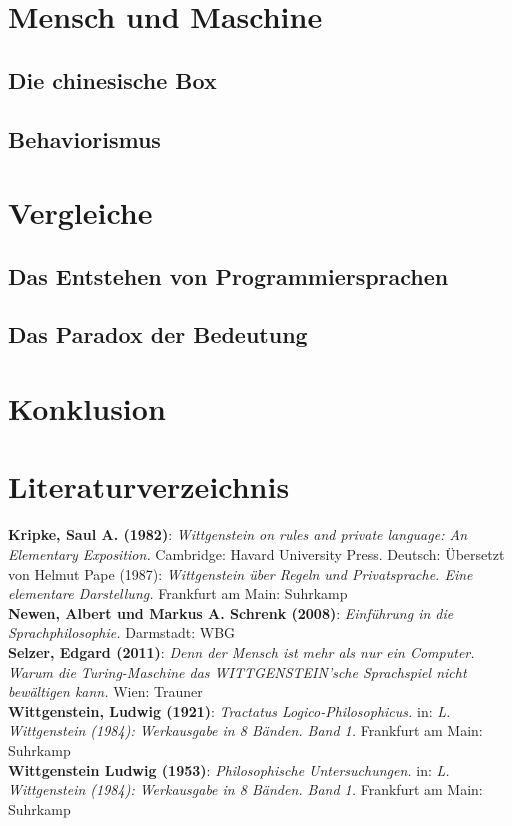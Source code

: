 \documentclass[a4paper,12pt]{article}
\begin{document}
\section{Mensch und Maschine}
\blindtext[1]

\subsection{Die chinesische Box}
\blindtext[1]

\subsection{Behaviorismus}
\blindtext[1]


\section{Vergleiche}
\blindtext[1]

\subsection{Das Entstehen von Programmiersprachen}
\blindtext[1]

\subsection{Das Paradox der Bedeutung}
\blindtext[1]

\section{Konklusion}
\blindtext[1]

\section*{Literaturverzeichnis}
\textbf{Kripke, Saul A. (1982)}: \textit{Wittgenstein on rules and private language: An Elementary Exposition.} Cambridge: Havard University Press. Deutsch: Übersetzt von Helmut Pape (1987): \textit{Wittgenstein über Regeln und Privatsprache. Eine elementare Darstellung.} Frankfurt am Main: Suhrkamp \\
\textbf{Newen, Albert und Markus A. Schrenk (2008)}: \textit{Einführung in die Sprachphilosophie.} Darmstadt: WBG \\
\textbf{Selzer, Edgard (2011)}: \textit{Denn der Mensch ist mehr als nur ein Computer. Warum die Turing-Maschine das WITTGENSTEIN'sche Sprachspiel nicht bewältigen kann.} Wien: Trauner \\
\textbf{Wittgenstein, Ludwig (1921)}: \textit{Tractatus Logico-Philosophicus.} in: \textit{L. Wittgenstein (1984): Werkausgabe in 8 Bänden. Band 1.} Frankfurt am Main: Suhrkamp \\
\textbf{Wittgenstein Ludwig (1953)}: \textit{Philosophische Untersuchungen.} in: \textit{L. Wittgenstein (1984): Werkausgabe in 8 Bänden. Band 1.} Frankfurt am Main: Suhrkamp \\
\end{document}
